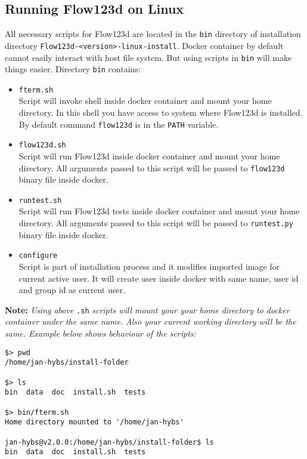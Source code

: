 \documentclass[12pt,a4paper]{report}
\begin{document}
\subsection{Running Flow123d on Linux}
\label{subsec:running-flow123d-on-linux}
All necessary scripts for Flow123d are located in the \verb'bin' directory of installation directory \verb'Flow123d-<version>-linux-install'.
Docker container by default cannot easily interact with host file system. But using scripts in \verb'bin' will make things easier.
Directory \verb'bin' contains:
\begin{itemize}
	\item \verb'fterm.sh' \\
	 Script will invoke shell inside docker container and mount your home directory.
	 In this shell you have access to system where Flow123d is installed. By default command \verb'flow123d' is in the \verb'PATH' variable.

	\item \verb'flow123d.sh' \\
	 Script will run Flow123d inside docker container and mount your home  directory.
	 All arguments passed to this script will be passed to \verb'flow123d' binary file inside docker.

	\item \verb'runtest.sh' \\
	 Script will run Flow123d tests inside docker container and mount your home  directory.
	 All arguments passed to this script will be passed to \verb'runtest.py' binary file inside docker.
	 
	\item \verb'configure' \\
	 Script is part of installation process and it modifies imported image for current active user. It will create user inside docker
	 with same name, user id and group id as current user.	 	 
\end{itemize}

\textbf{Note:}
\textit{Using above} \verb'.sh' \textit{scripts will mount your your home  directory to docker container under the same name.}
\textit{Also your current working directory will be the same. Example below shows behaviour of the scripts:}
\begin{verbatim}
$> pwd
/home/jan-hybs/install-folder

$> ls
bin  data  doc	install.sh  tests

$> bin/fterm.sh
Home directory mounted to '/home/jan-hybs'

jan-hybs@v2.0.0:/home/jan-hybs/install-folder$ ls
bin  data  doc	install.sh  tests
\end{verbatim}
\end{document}
